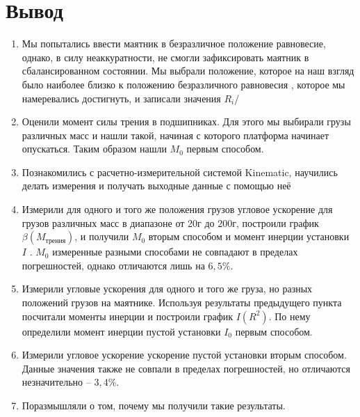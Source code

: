 \documentclass[a4paper,12pt]{article} %
\begin{document}
\section{Вывод}
\begin{enumerate}
    \item Мы попытались ввести маятник в безразличное положение равновесие, однако, в силу неаккуратности, не смогли 
    зафиксировать маятник в сбалансированном состоянии. Мы выбрали положение, которое на наш взгляд было наиболее близко к положению безразличного равновесия
    , которое мы намеревались достигнуть, и записали значения $ R_i $/
    \item Оценили момент силы трения в подшипниках. Для этого мы выбирали грузы различных масс и нашли такой, начиная с которого платформа начинает опускаться. Таким образом нашли $ M_0 $ первым способом.
    \item Познакомились с расчетно-измерительной системой Kinematic, научились делать измерения и получать выходные данные с помощью неё
    \item Измерили для одного и того же положения грузов угловое ускорение для грузов различных масс в диапазоне от 20г до 200г, построили график $ \beta(M_{ \text{трения}}) $, и получили $ M_0 $ вторым способом и момент инерции установки $ I $ . $ M_0 $ измеренные разными способами не 
    совпадают в пределах погрешностей, однако отличаются лишь на $ 6,5\% $. 
    \item Измерили угловые ускорения для одного и того же груза, но разных положений грузов на маятнике. Используя результаты предыдущего пункта посчитали моменты инерции и построили график $ I(R^2) $. По нему определили момент инерции пустой установки $ I_0 $ первым способом.
    \item Измерили угловое ускорение ускорение пустой установки  вторым способом. Данные значения также не совпали в пределах погрешностей, но отличаются незначительно -- $ 3,4\% $.
    \item Поразмышляли о том, почему мы получили такие результаты.
\end{enumerate}
\end{document}
